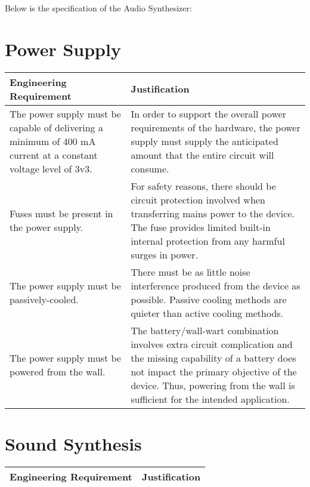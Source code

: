 \documentclass{article}
\begin{document}
\newenvironment{frcseries}{\fontfamily{frc}\selectfont}{}
\newcommand{\textfrc}[1]{{\frcseries#1}}
\newcommand{\mathfrc}[1]{\text{\textfrc{#1}}}

Below is the specification of the Audio Synthesizer:

\section{Power Supply}

\begin{tabular}{|p{3in}|p{3in}|}
\hline
Engineering Requirement & Justification \\
\hline
The power supply must be capable of delivering a minimum of 400 mA current at a constant voltage level of 3v3.&In order to support the overall power requirements of the hardware, the power supply must supply the anticipated amount that the entire circuit will consume.\\
\hline
 Fuses must be present in the power supply.&For safety reasons, there should be circuit protection involved when transferring mains power to the device.  The fuse provides limited built-in internal protection from any harmful surges in power.\\
\hline
The power supply must be passively-cooled.&There must be as little noise interference produced from the device as possible.  Passive cooling methods are quieter than active cooling methods.\\
\hline
The power supply must be powered from the wall.&The battery/wall-wart combination involves extra circuit complication and the missing capability of a battery does not impact the primary objective of the device.  Thus, powering from the wall is sufficient for the intended application.\\
\hline
\end{tabular}

\section{Sound Synthesis}

\begin{tabular}{|p{3in}|p{3in}|}
\hline
Engineering Requirement & Justification \\
\hline
\end{tabular}
\end{document}

